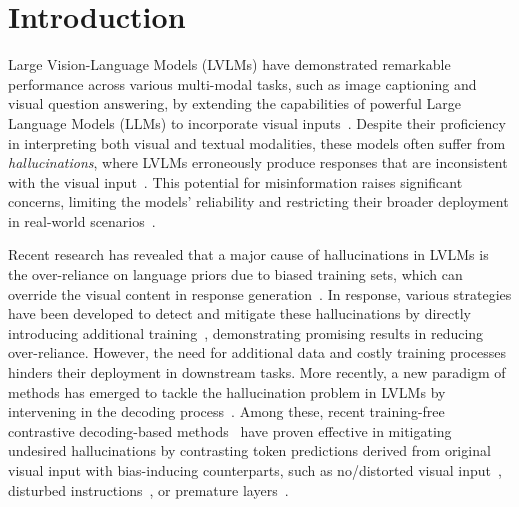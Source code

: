 \vspace{-10pt}

\section{Introduction}
\vspace{-4pt}
\label{sec:intro}
Large Vision-Language Models (LVLMs) have demonstrated remarkable performance across various multi-modal tasks, such as image captioning and visual question answering, by extending the capabilities of powerful Large Language Models (LLMs) to incorporate visual inputs~\citep{liu2023visual,li2023blip,dai2024instructblip,bai2023qwen,ye2024mplug}. Despite their proficiency in interpreting both visual and textual modalities, these models often suffer from \textit{hallucinations}, where LVLMs erroneously produce responses that are inconsistent with the visual input~\citep{li2023evaluating,gunjal2024detecting,yin2023woodpecker,wu2024evaluating}.
This potential for misinformation raises significant concerns, limiting the models' reliability and restricting their broader deployment in real-world scenarios~\citep{liu2024survey,bai2024hallucination,chen2024detecting,zhao2024fact}.

Recent research has revealed that a major cause of hallucinations in LVLMs is the over-reliance on language priors due to biased training sets, which can override the visual content in response generation~\citep{bai2024hallucination,liu2024survey,leng2024mitigating}. In response, various strategies have been developed to detect and mitigate these hallucinations by directly introducing additional training~\citep{chen2024alleviating,sun2023aligning,jiang2024hallucination, chen2023mitigating,zhang2024reflective}, demonstrating promising results in reducing over-reliance. However, the need for additional data and costly training processes hinders their deployment in downstream tasks. 
More recently, a new paradigm of methods has emerged to tackle the hallucination problem in LVLMs by intervening in the decoding process~\citep{huang2024opera,deng2024seeing,kim2024code}. Among these, recent training-free contrastive decoding-based methods~\citep{li2023contrastive} have proven effective in mitigating undesired hallucinations by contrasting token predictions derived from original visual input with bias-inducing counterparts, such as no/distorted visual input~\citep{favero2024multi,leng2024mitigating}, disturbed instructions~\citep{wang2024mitigating2}, or premature layers~\citep{chuang2024dola}. 

